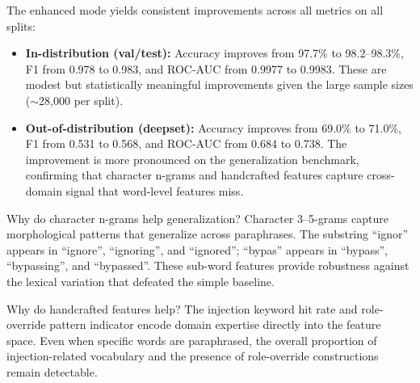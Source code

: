 \documentclass[12pt, letterpaper]{article}   %
\begin{document}
\begin{table}[h!]
    \centering
    \renewcommand{\arraystretch}{1.5}
    \caption{Performance of the Enhanced TF-IDF + Logistic Regression baseline across all evaluation splits.}
    \label{tab:baseline_enhanced}
\end{table}

The enhanced mode yields consistent improvements across all metrics on all splits:

\begin{itemize}
    \item \textbf{In-distribution (val/test):} Accuracy improves from 97.7\% to 98.2--98.3\%, F1 from 0.978 to 0.983, and ROC-AUC from 0.9977 to 0.9983. These are modest but statistically meaningful improvements given the large sample sizes ($\sim$28,000 per split).
    \item \textbf{Out-of-distribution (deepset):} Accuracy improves from 69.0\% to 71.0\%, F1 from 0.531 to 0.568, and ROC-AUC from 0.684 to 0.738. The improvement is more pronounced on the generalization benchmark, confirming that character n-grams and handcrafted features capture cross-domain signal that word-level features miss.
\end{itemize}

Why do character n-grams help generalization? Character 3--5-grams capture morphological patterns that generalize across paraphrases. The substring ``ignor'' appears in ``ignore'', ``ignoring'', and ``ignored''; ``bypas'' appears in ``bypass'', ``bypassing'', and ``bypassed''. These sub-word features provide robustness against the lexical variation that defeated the simple baseline.

Why do handcrafted features help? The injection keyword hit rate and role-override pattern indicator encode domain expertise directly into the feature space. Even when specific words are paraphrased, the overall proportion of injection-related vocabulary and the presence of role-override constructions remain detectable.
\end{document}

